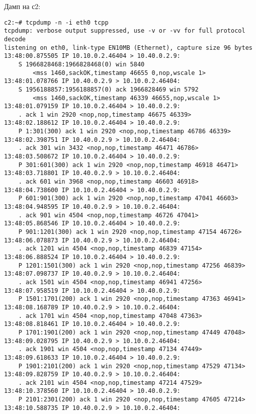 \documentclass[a4paper,12pt]{article}
\begin{document}
Дамп на с2:
\begin{Verbatim}
c2:~# tcpdump -n -i eth0 tcpp
tcpdump: verbose output suppressed, use -v or -vv for full protocol decode
listening on eth0, link-type EN10MB (Ethernet), capture size 96 bytes
13:48:00.875505 IP 10.10.0.2.46404 > 10.40.0.2.9: 
    S 1966828468:1966828468(0) win 5840 
        <mss 1460,sackOK,timestamp 46655 0,nop,wscale 1>
13:48:01.078766 IP 10.40.0.2.9 > 10.10.0.2.46404: 
    S 1956188857:1956188857(0) ack 1966828469 win 5792 
        <mss 1460,sackOK,timestamp 46339 46655,nop,wscale 1>
13:48:01.079159 IP 10.10.0.2.46404 > 10.40.0.2.9: 
    . ack 1 win 2920 <nop,nop,timestamp 46675 46339>
13:48:02.188612 IP 10.10.0.2.46404 > 10.40.0.2.9: 
    P 1:301(300) ack 1 win 2920 <nop,nop,timestamp 46786 46339>
13:48:02.398751 IP 10.40.0.2.9 > 10.10.0.2.46404: 
    . ack 301 win 3432 <nop,nop,timestamp 46471 46786>
13:48:03.508672 IP 10.10.0.2.46404 > 10.40.0.2.9: 
    P 301:601(300) ack 1 win 2920 <nop,nop,timestamp 46918 46471>
13:48:03.718801 IP 10.40.0.2.9 > 10.10.0.2.46404: 
    . ack 601 win 3968 <nop,nop,timestamp 46603 46918>
13:48:04.738600 IP 10.10.0.2.46404 > 10.40.0.2.9: 
    P 601:901(300) ack 1 win 2920 <nop,nop,timestamp 47041 46603>
13:48:04.948595 IP 10.40.0.2.9 > 10.10.0.2.46404: 
    . ack 901 win 4504 <nop,nop,timestamp 46726 47041>
13:48:05.868546 IP 10.10.0.2.46404 > 10.40.0.2.9: 
    P 901:1201(300) ack 1 win 2920 <nop,nop,timestamp 47154 46726>
13:48:06.078873 IP 10.40.0.2.9 > 10.10.0.2.46404: 
    . ack 1201 win 4504 <nop,nop,timestamp 46839 47154>
13:48:06.888524 IP 10.10.0.2.46404 > 10.40.0.2.9: 
    P 1201:1501(300) ack 1 win 2920 <nop,nop,timestamp 47256 46839>
13:48:07.098737 IP 10.40.0.2.9 > 10.10.0.2.46404: 
    . ack 1501 win 4504 <nop,nop,timestamp 46941 47256>
13:48:07.958519 IP 10.10.0.2.46404 > 10.40.0.2.9: 
    P 1501:1701(200) ack 1 win 2920 <nop,nop,timestamp 47363 46941>
13:48:08.168789 IP 10.40.0.2.9 > 10.10.0.2.46404: 
    . ack 1701 win 4504 <nop,nop,timestamp 47048 47363>
13:48:08.818461 IP 10.10.0.2.46404 > 10.40.0.2.9: 
    P 1701:1901(200) ack 1 win 2920 <nop,nop,timestamp 47449 47048>
13:48:09.028795 IP 10.40.0.2.9 > 10.10.0.2.46404: 
    . ack 1901 win 4504 <nop,nop,timestamp 47134 47449>
13:48:09.618633 IP 10.10.0.2.46404 > 10.40.0.2.9: 
    P 1901:2101(200) ack 1 win 2920 <nop,nop,timestamp 47529 47134>
13:48:09.828759 IP 10.40.0.2.9 > 10.10.0.2.46404: 
    . ack 2101 win 4504 <nop,nop,timestamp 47214 47529>
13:48:10.378560 IP 10.10.0.2.46404 > 10.40.0.2.9: 
    P 2101:2301(200) ack 1 win 2920 <nop,nop,timestamp 47605 47214>
13:48:10.588735 IP 10.40.0.2.9 > 10.10.0.2.46404: 

\end{Verbatim}
\end{document}
